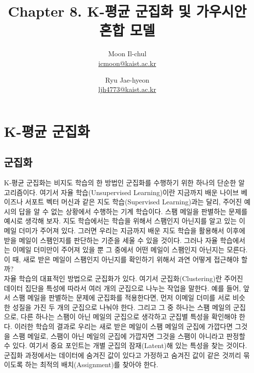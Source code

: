 \documentclass[a4paper]{oblivoir}
\author{Moon Il-chul \\ \href{mailto:icmoon@kaist.ac.kr}{icmoon@kaist.ac.kr} 
   \and Ryu Jae-hyeon
 \\ \href{mailto:ljh4773@kaist.ac.kr}{ljh4773@kaist.ac.kr} }
\title{Chapter 8. K-평균 군집화 및 가우시안 혼합 모델}
\begin{document}
\maketitle

\tableofcontents

\section{K-평균 군집화}

\subsection{군집화}

K-평균 군집화는 비지도 학습의 한 방법인 군집화를 수행하기 위한 하나의 단순한 알고리즘이다. 여기서 자율 학습(Unsupervised Learning)이란 지금까지 배운 나이브 베이즈나 서포트 벡터 머신과 같은 지도 학습(Supervised Learning)과는 달리, 주어진 예시의 답을 알 수 없는 상황에서 수행하는 기계 학습이다. 스팸 메일을 판별하는 문제를 예시로 생각해 보자. 지도 학습에서는 학습을 위해서 스팸인지 아닌지를 알고 있는 이메일 더미가 주어져 있다. 그러면 우리는 지금까지 배운 지도 학습을 활용해서 이후에 받을 메일이 스팸인지를 판단하는 기준을 세울 수 있을 것이다. 그러나 자율 학습에서는 이메일 더미만이 주어져 있을 뿐 그 중에서 어떤 메일이 스팸인지 아닌지는 모른다. 이 때, 새로 받은 메일이 스팸인지 아닌지를 확인하기 위해서 과연 어떻게 접근해야 할까? \\

자율 학습의 대표적인 방법으로 군집화가 있다. 여기서 군집화(Clustering)란 주어진 데이터 집단을 특성에 따라서 여러 개의 군집으로 나누는 작업을 말한다. 예를 들어, 앞서 스팸 메일을 판별하는 문제에 군집화를 적용한다면, 먼저 이메일 더미를 서로 비슷한 성질을 가진 두 개의 군집으로 나눠야 한다. 그리고 그 중 하나는 스팸 메일의 군집으로, 다른 하나는 스팸이 아닌 메일의 군집으로 생각하고 군집별 특성을 확인해야 한다. 이러한 학습의 결과로 우리는 새로 받은 메일이 스팸 메일의 군집에 가깝다면 그것을 스팸 메일로, 스팸이 아닌 메일의 군집에 가깝자면 그것을 스팸이 아니라고 판정할 수 있다. 여기서 중요 포인트는 개별 군집의 잠재(Latent)해 있는 특성을 찾는 것이다. 군집화 과정에서는 데이터에 숨겨진 값이 있다고 가정하고 숨겨진 값이 같은 것끼리 묶이도록 하는 최적의 배치(Assignment)를 찾아야 한다. \\
\end{document}
